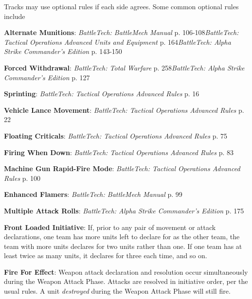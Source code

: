Tracks may use optional rules if each side agrees.
Some common optional rules include

\begin{description}

  \item {\bfseries Alternate Munitions}: \emph{BattleTech: BattleMech Manual} p. 106-108\emph{BattleTech: Tactical Operations Advanced Units and Equipment} p. 164\emph{BattleTech: Alpha Strike Commander's Edition} p. 143-150

  \item {\bfseries Forced Withdrawal}: \emph{BattleTech: Total Warfare} p. 258\emph{BattleTech: Alpha Strike Commander's Edition} p. 127

  \item {\bfseries Sprinting}: \emph{BattleTech: Tactical Operations Advanced Rules} p. 16

  \item {\bfseries Vehicle Lance Movement}: \emph{BattleTech: Tactical Operations Advanced Rules} p. 22

  \item {\bfseries Floating Criticals}: \emph{BattleTech: Tactical Operations Advanced Rules} p. 75

  \item {\bfseries Firing When Down}: \emph{BattleTech: Tactical Operations Advanced Rules} p. 83

  \item {\bfseries Machine Gun Rapid-Fire Mode}: \emph{BattleTech: Tactical Operations Advanced Rules} p. 100

  \item {\bfseries Enhanced Flamers}: \emph{BattleTech: BattleMech Manual} p. 99

  \item {\bfseries Multiple Attack Rolls}: \emph{BattleTech: Alpha Strike Commander's Edition} p. 175

  \item {\bfseries Front Loaded Initiative}: If, prior to any pair of movement or attack declarations, one team has more units left to declare for as the other team, the team with more units declares for two units rather than one.
If one team has at least twice as many units, it declares for three each time, and so on.

  \item {\bfseries Fire For Effect}: Weapon attack declaration and resolution occur simultaneously during the Weapon Attack Phase.
        Attacks are resolved in initiative order, per the usual rules.
        A unit \emph{destroyed} during the Weapon Attack Phase will still fire.

\end{description}
